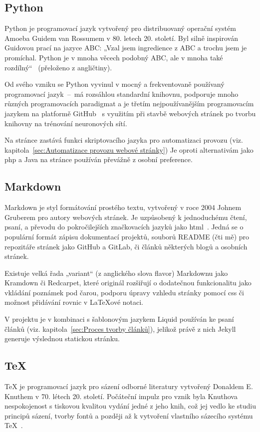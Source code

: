 \documentclass[a4paper, 12pt]{article}
\newcommand*{\fullref}[1]{\hyperref[{#1}]{\ref*{#1}}}
\begin{document}
  \subsection{Python} \label{sec:Python}
  Python je programovací jazyk vytvořený pro distribuovaný operační systém Amoeba Guidem van Rossumem v 80. letech 20. století. Byl silně inspirován Guidovou prací na jazyce ABC: „Vzal jsem ingredience z ABC a trochu jsem je promíchal. Python je v mnoha věcech podobný ABC, ale v mnoha také rozdílný“~\cite{making-of-python} (přeloženo z angličtiny).

  Od svého vzniku se Python vyvinul v mocný a frekventovaně používaný programovací jazyk~--~má rozsáhlou standardní knihovnu, podporuje mnoho různých programovacích paradigmat a je třetím nejpoužívanějším programovacím jazykem na platformě GitHub~\cite{github-statistics} s využitím při stavbě webových stránek po tvorbu knihovny na trénování neuronových sítí.

  Na stránce zastává funkci skriptovacího jazyka pro automatizaci provozu (viz. kapitola~\fullref{sec:Automatizace provozu webové stránky}) Je oproti alternativám jako \gls{php} a Java na stránce používán převážně z osobní preference.


  \subsection{Markdown} \label{sec:Markdown}
  Markdown je styl formátování prostého textu, vytvořený v roce 2004 Johnem Gruberem pro autory webových stránek. Je uzpůsobený k jednoduchému čtení, psaní, a převodu do pokročilejších značkovacích jazyků jako \gls{html}~\cite{markdown-history}. Jedná se o populární formát zápisu dokumentací projektů, souborů README (čti mě) pro repozitáře stránek jako GitHub a GitLab, či článků některých blogů a osobních stránek.

  Existuje velká řada „variant“ (z anglického slova flavor) Markdownu jako Kramdown či Redcarpet, které originál rozšiřují o dodatečnou funkcionalitu jako vkládání poznámek pod čarou, podporu úpravy vzhledu stránky pomocí \gls{css} či možnost přidávání rovnic v \LaTeX ové notaci.

  V projektu je v kombinaci s šablonovým jazykem Liquid používán ke psaní článků (viz. kapitola~\fullref{sec:Proces tvorby článků}), jelikož právě z nich Jekyll generuje výslednou statickou stránku.


  \subsection{\TeX} \label{sec:TeX}
  \TeX{} je programovací jazyk pro sázení odborné literatury vytvořený Donaldem E. Knuthem v 70. létech 20. století. Počáteční impulz pro vznik byla Knuthova nespokojenost s tiskovou kvalitou vydání jedné z jeho knih, což jej vedlo ke studiu principů sázení, tvorby fontů a později až k vytvoření vlastního sázecího systému \TeX{}~\cite{tex-history}.
\end{document}
